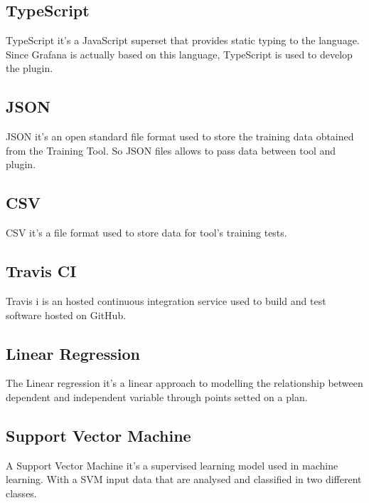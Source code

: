 \subsection{TypeScript}
TypeScript it's a JavaScript superset that provides static typing to the language. Since Grafana is actually based on this language, TypeScript is used to develop the plugin.

\subsection{JSON}
JSON it's an open standard file format used to store the training data obtained from the Training Tool. So JSON files allows to pass data between tool and plugin.

\subsection{CSV}
CSV it's a file format used to store data for tool's training tests.

\subsection{Travis CI}
Travis i is an hosted continuous integration service used to build and test software hosted on GitHub.

\subsection{Linear Regression}
The Linear regression it's a linear approach to modelling the relationship between dependent and independent variable through points setted on a plan.

\subsection{Support Vector Machine}
A Support Vector Machine it's a supervised learning model used in machine learning. With a SVM input data that are analysed  and classified in two different classes.
 